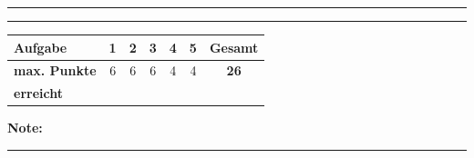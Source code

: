 \documentclass[11pt, a4paper]{article}
\newcommand{\luecke}[1]{\rule{#1}{0.4pt}}
\begin{document}
\vspace{5pt}

\noindent \luecke{10cm}


\vspace{20pt}
\hrule
\vspace{10pt}

\noindent
\begin{tabularx}{\textwidth}{|X|c|c|c|c|c||c|}
\hline
\textbf{Aufgabe} & 1 & 2 & 3 & 4 & 5 & \textbf{Gesamt} \\
\hline
\textbf{max. Punkte} & 6 & 6 & 6 & 4 & 4 & \textbf{26} \\
\hline
\textbf{erreicht} & & & & & & \\[0.6em]
\hline
\end{tabularx}

\vspace{10pt}

\begin{flushright}
\textbf{Note:} \luecke{2cm}
\end{flushright}
\end{document}
